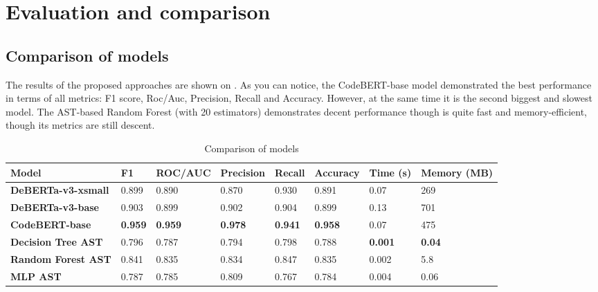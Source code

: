 \documentclass{article}
\begin{document}
\section{Evaluation and comparison}

\subsection{Comparison of models}

The results of the proposed approaches are shown on . As you can notice, the CodeBERT-base model demonstrated the best performance in terms of all metrics: F1 score, Roc/Auc, Precision, Recall and Accuracy. However, at the same time it is the second biggest and slowest model. The AST-based Random Forest (with 20 estimators) demonstrates decent performance though is quite fast and memory-efficient, though its metrics are still descent.
\begin{table}[ht!]
  \small
  \centering
  \caption{Comparison of models}\label{tab:model_comparison}
  \begin{tabular}{llllllll}
    \toprule
    Model                      & {F1}           & {ROC/AUC}      & {Precision}    & {Recall}       & {Accuracy}     & {Time (s)}     & {Memory (MB)} \\
    \midrule
    \textbf{DeBERTa-v3-xsmall} & 0.899          & 0.890          & 0.870          & 0.930          & 0.891          & 0.07           & 269           \\
    \textbf{DeBERTa-v3-base}   & 0.903          & 0.899          & 0.902          & 0.904          & 0.899          & 0.13           & 701           \\
    \textbf{CodeBERT-base}     & \textbf{0.959} & \textbf{0.959} & \textbf{0.978} & \textbf{0.941} & \textbf{0.958} & 0.07           & 475           \\
    \midrule
    \textbf{Decision Tree AST} & 0.796          & 0.787          & 0.794          & 0.798          & 0.788          & \textbf{0.001} & \textbf{0.04} \\
    \textbf{Random Forest AST} & 0.841          & 0.835          & 0.834          & 0.847          & 0.835          & 0.002          & 5.8           \\
    \textbf{MLP AST}           & 0.787          & 0.785          & 0.809          & 0.767          & 0.784          & 0.004          & 0.06          \\
    \bottomrule
  \end{tabular}
\end{table}
\end{document}
